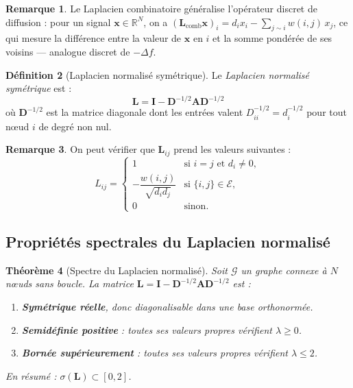 \documentclass[12pt, a4paper]{article}
\newtheorem{theorem}{Théorème}[section]
\theoremstyle{definition}
\newtheorem{definition}[theorem]{Définition}
\newtheorem{remark}[theorem]{Remarque}
\newcommand{\R}{\mathbb{R}}
\newcommand{\calG}{\mathcal{G}}
\newcommand{\calE}{\mathcal{E}}
\newcommand{\mat}[1]{\mathbf{#1}}
\newcommand{\A}{\mat{A}}
\newcommand{\D}{\mat{D}}
\newcommand{\I}{\mat{I}}
\newcommand{\L}{\mat{L}}
\newcommand{\x}{\mathbf{x}}
\begin{document}
\begin{remark}
Le Laplacien combinatoire généralise l'opérateur discret de diffusion :
pour un signal $\x \in \R^N$, on a
$(\L_{\mathrm{comb}} \x)_i = d_i x_i - \sum_{j \sim i} w(i,j)\, x_j$,
ce qui mesure la différence entre la valeur de $\x$ en $i$ et la somme pondérée
de ses voisins --- analogue discret de $-\Delta f$.
\end{remark}

\begin{definition}[Laplacien normalisé symétrique]
\label{def:normalized_laplacian}
Le \emph{Laplacien normalisé symétrique} est :
\[
  \boxed{\L = \I - \D^{-1/2} \A \D^{-1/2}}
\]
où $\D^{-1/2}$ est la matrice diagonale dont les entrées valent
$D^{-1/2}_{ii} = d_i^{-1/2}$ pour tout nœud $i$ de degré non nul.
\end{definition}

\begin{remark}
On peut vérifier que $\L_{ij}$ prend les valeurs suivantes :
\[
  L_{ij} =
  \begin{cases}
    1 & \text{si } i = j \text{ et } d_i \neq 0, \\
    -\dfrac{w(i,j)}{\sqrt{d_i d_j}} & \text{si } \{i,j\} \in \calE, \\
    0 & \text{sinon.}
  \end{cases}
\]
\end{remark}

\subsection{Propriétés spectrales du Laplacien normalisé}

\begin{theorem}[Spectre du Laplacien normalisé]
\label{thm:spectrum}
Soit $\calG$ un graphe connexe à $N$ nœuds sans boucle.
La matrice $\L = \I - \D^{-1/2} \A \D^{-1/2}$ est :
\begin{enumerate}
  \item \textbf{Symétrique réelle}, donc diagonalisable dans une base orthonormée.
  \item \textbf{Semidéfinie positive} : toutes ses valeurs propres vérifient $\lambda \geq 0$.
  \item \textbf{Bornée supérieurement} : toutes ses valeurs propres vérifient $\lambda \leq 2$.
\end{enumerate}
En résumé : $\sigma(\L) \subset [0, 2]$.
\end{theorem}
\end{document}
